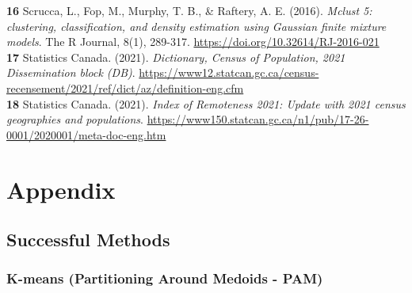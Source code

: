 \documentclass[11pt, a4paper]{article}
\newcommand{\comment}[1]{}
\begin{document}
\noindent\textbf{16} Scrucca, L., Fop, M., Murphy, T. B., \& Raftery, A. E. (2016). \textit{Mclust 5: clustering, classification, and density estimation using Gaussian finite mixture models}. The R Journal, 8(1), 289-317.  \sloppy\url{https://doi.org/10.32614/RJ-2016-021} \\

\noindent\textbf{17} Statistics Canada. (2021). \textit{Dictionary, Census of Population, 2021
Dissemination block (DB)}. \sloppy\url{https://www12.statcan.gc.ca/census-recensement/2021/ref/dict/az/definition-eng.cfm} \\

\noindent\textbf{18} Statistics Canada. (2021). \textit{Index of Remoteness 2021: Update with 2021 census geographies and populations}. \sloppy\url{https://www150.statcan.gc.ca/n1/pub/17-26-0001/2020001/meta-doc-eng.htm} \\













\comment{

\renewcommand{\bibsection}{}

}






\pagebreak
\appendix
\section{Appendix}


\subsection{Successful Methods}\label{appendix:successful}


\subsubsection{K-means (Partitioning Around Medoids - PAM)}
\end{document}
